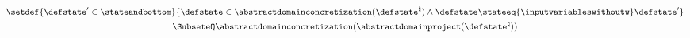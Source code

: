 \begin{gather*}
\setdef{\defstate'\in\stateandbottom}{\defstate\in\abstractdomainconcretization(\defstate^\natural) \land \defstate \stateeq{\inputvariableswithoutw} \defstate'} \\ \SubseteQ
\abstractdomainconcretization(\abstractdomainproject(\defstate^\natural))
\end{gather*}

